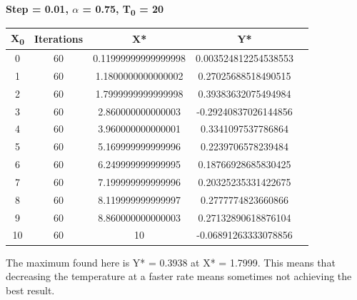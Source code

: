 \documentclass[paper=a4, fontsize=11pt]{scrartcl} %
\numberwithin{equation}{section} %
\numberwithin{figure}{section} %
\numberwithin{table}{section} %
\begin{document}
\begin{center}
\textbf{Step = 0.01, \(\alpha\) = 0.75, T\textsubscript{0} = 20 \\}
\begin{tabular}{ |c|c|c|c|c| } 
	\hline
	\textbf{X\textsubscript{0}} & \textbf{Iterations} & \textbf{X*} & \textbf{Y*} \\ 
	\hline
    0 & 60 & 0.11999999999999998 & 0.003524812254538553 \\
    1 & 60 & 1.1800000000000002 & 0.27025688518490515 \\
    2 & 60 & 1.7999999999999998 & 0.39383632075494984 \\
    3 & 60 & 2.860000000000003 & -0.29240837026144856 \\
    4 & 60 & 3.960000000000001 & 0.3341097537786864 \\
    5 & 60 & 5.169999999999996 & 0.2239706578239484 \\
    6 & 60 & 6.249999999999995 & 0.18766928685830425 \\
    7 & 60 & 7.199999999999996 & 0.20325235331422675 \\
    8 & 60 & 8.119999999999997 & 0.2777774823660866 \\
    9 & 60 & 8.860000000000003 & 0.27132890618876104 \\
    10 & 60 & 10 & -0.06891263333078856 \\
	\hline
\end{tabular}
\end{center}

The maximum found here is Y* = 0.3938 at X* = 1.7999. This means that decreasing the temperature at a faster rate means sometimes not achieving the best result. \\
\end{document}
